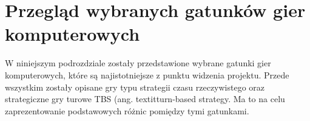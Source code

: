 \section{Przegląd wybranych gatunków gier komputerowych}
W niniejszym podrozdziale zostały przedstawione wybrane gatunki gier komputerowych, które są najistotniejsze z punktu widzenia
projektu. Przede wszystkim zostały opisane gry typu strategii czasu rzeczywistego oraz strategiczne gry turowe TBS (ang.
textit{turn-based strategy}. Ma to na celu zaprezentowanie podstawowych różnic pomiędzy tymi gatunkami.





